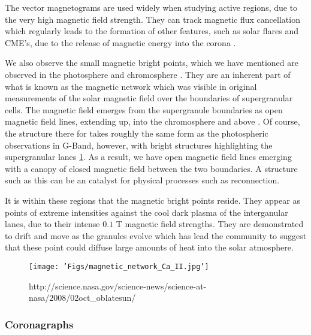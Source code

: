 The vector magnetograms are used widely when studying active regions, due to the very high magnetic field strength.
They can track magnetic flux cancellation which regularly leads to the formation of other features, such as solar flares and CME's, due to the release of magnetic energy into the corona \cite{Welsch2006}.

We also observe the small magnetic bright points, which we have mentioned are observed in the photosphere and chromosphere \cite{SanchesAlmeida2010}.
They are an inherent part of what is known as the magnetic network which was visible in original measurements of the solar magnetic field over the boundaries of supergranular cells.
The magnetic field emerges from the supergranule boundaries as open magnetic field lines, extending up, into the chromosphere and above \citep{Hasan2005}.
Of course, the structure there for takes roughly the same form as the photospheric observations in G-Band,  however, with bright structures highlighting the supergranular lanes \ref{fig:mag_network}.
As a result, we have open magnetic field lines emerging with a canopy of closed magnetic field between the two boundaries.
A structure such as this can be an catalyst for physical processes such as reconnection.

It is within these regions that the magnetic bright points reside.
They appear as points of extreme intensities against the cool dark plasma of the interganular lanes, due to their intense $0.1$ T magnetic field strengths.
They are demonstrated to drift and move as the granules evolve \citep{Chitta2012} which has lead the community to suggest that these point could diffuse large amounts of heat into the solar atmosphere.

\begin{figure}
	\texttt{[image: 'Figs/magnetic\_network\_Ca\_II.jpg']}
	\caption{http://science.nasa.gov/science-news/science-at-nasa/2008/02oct_oblatesun/}
	\label{fig:mag_network}
\end{figure}


\subsubsection{Coronagraphs}

